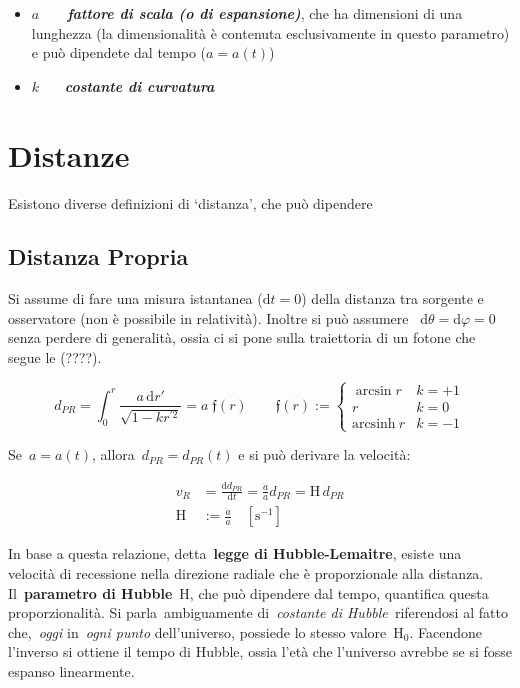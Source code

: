 \begin{itemize}
\item
  \(a\)~~~~\textbf{\emph{fattore di scala (o di
  espansione)}}, che ha dimensioni di una lunghezza (la dimensionalità è
  contenuta esclusivamente in questo parametro) e può dipendete dal
  tempo (\(a=a\left(t\right)\))
\item
  \(k\)~ ~~\textbf{\emph{costante di curvatura}}
\end{itemize}


\section{Distanze}\label{1:sec2distanze}

Esistono diverse definizioni di `distanza', che può dipendere~

\subsection{Distanza Propria}
Si assume di fare una misura istantanea (\(\mathrm{d}t=0\)) della
distanza tra sorgente e osservatore (non è possibile in relatività).
Inoltre si può assumere~ \(\mathrm{d}\theta=\mathrm{d}\varphi=0\) senza perdere di generalità,
ossia ci si pone sulla traiettoria di un fotone che segue le (????).~

\begin{equation}
    d_{PR}=\int_{0}^{r}\frac{a\,\mathrm{d}r'}{\sqrt{1-kr^{'2}}}=a\; \mathfrak{f}(r) \qquad \mathfrak{f}(r):=\left\{\begin{matrix}
\arcsin r& k=+1\\ 
r & k=0\\ 
\mathrm{arcsinh}\:  r & k=-1
\end{matrix}\right.
\end{equation}

Se~\(a=a\left(t\right)\), allora~\(d_{PR}=d_{PR}(t)\) e si può derivare la
velocità:

\begin{align*}
v_R & =\frac{\mathrm{d}d_{PR}}{\mathrm{d}t}=\frac{\dot{a}}{a}d_{PR}=\textrm{H}\,d_{PR}  \\
\textrm{H} & :=\frac{\dot{a}}{a}\quad [\mathrm{s^{-1}}]
\end{align*}

In base a questa relazione, detta~\textbf{legge di Hubble-Lemaitre},
esiste una velocità di recessione nella direzione radiale che è
proporzionale alla distanza. Il~\textbf{parametro di
Hubble}~\(\textrm{H}\), che può dipendere dal tempo, quantifica
questa proporzionalità. Si parla~ambiguamente di~\emph{costante di
Hubble~}riferendosi al fatto che,~\emph{oggi} in~\emph{ogni punto}
dell'universo, possiede lo stesso valore~\(\textrm{H}_0\). Facendone
l'inverso si ottiene il tempo di Hubble, ossia l'età che l'universo
avrebbe se si fosse espanso linearmente.

